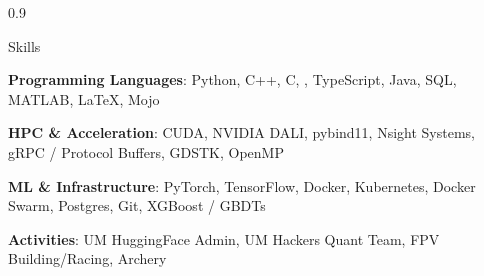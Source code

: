 \documentclass{resume} %
\begin{document}
\begin{spacing}{0.9}
\vspace{-0.5em}
\vspace{-0.5em}
\vspace{-0.5em}












\begin{rSection}{Skills}
\vspace{-0.2em}

\textbf{Programming Languages}: Python, C++, C, , TypeScript, Java, SQL, MATLAB, \LaTeX, Mojo
\vspace{-0.5em}

\textbf{HPC \& Acceleration}: CUDA, NVIDIA DALI, pybind11, Nsight Systems, gRPC / Protocol Buffers, GDSTK, OpenMP
\vspace{-0.5em}

\textbf{ML \& Infrastructure}: PyTorch, TensorFlow, Docker, Kubernetes, Docker Swarm, Postgres, Git, XGBoost / GBDTs
\vspace{-0.5em}

\textbf{Activities}: UM HuggingFace Admin, UM Hackers Quant Team, FPV Building/Racing, Archery 
\vspace{-1.5em}

\end{rSection}

\end{spacing}
\end{document}
